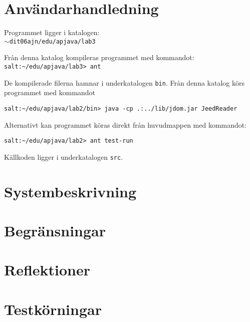 \documentclass[a4paper, 12pt]{article}
\def\pathtocode{$\sim$dit06ajn/edu/apjava/lab3}
\begin{document}
\section{Användarhandledning}\label{Anvandarhandledning}
Programmet ligger i katalogen:\\
\texttt{\pathtocode}

Från denna katalog kompileras programmet med kommandot:
\verb!salt:~/edu/apjava/lab3> ant!

De kompilerade filerna hamnar i underkatalogen \verb!bin!. Från denna
katalog körs programmet med kommandot

\verb!salt:~/edu/apjava/lab2/bin> java -cp .:../lib/jdom.jar JeedReader!

Alternativt kan programmet köras direkt från huvudmappen med
kommandot:

\verb!salt:~/edu/apjava/lab2> ant test-run!


Källkoden ligger i underkatalogen \verb!src!.

\section{Systembeskrivning}\label{Systembeskrivning}


\section{Begränsningar}\label{Begransningar}

\section{Reflektioner}\label{Reflektioner}

\section{Testkörningar}\label{Testkorningar}
\end{document}
